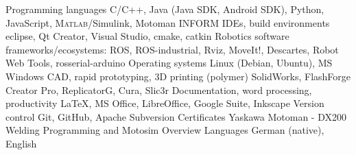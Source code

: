 
\begin{cvskills}
  \cvskill
    {Programming languages}
    {C/C++, Java (Java SDK, Android SDK), Python, JavaScript, \textsc{Matlab}/Simulink, \newline Motoman INFORM}
  \cvskill
    {IDEs, build environments}
    {eclipse, Qt Creator, Visual Studio, cmake, catkin}
  \cvskill
    {Robotics software frameworks/ecosystems:}
    {ROS, ROS-industrial, Rviz, MoveIt!, Descartes, Robot Web Tools, \newline rosserial-arduino}
  \cvskill
    {Operating systems}
    {Linux (Debian, Ubuntu), MS Windows}
  \cvskill
    {CAD, rapid prototyping, 3D printing (polymer)}
    {SolidWorks, FlashForge Creator Pro, ReplicatorG, Cura, Slic3r}
  \cvskill
    {Documentation, word processing, productivity}
    {\LaTeX, MS Office, LibreOffice, Google Suite, Inkscape}
  \cvskill
    {Version control}
    {Git, GitHub, Apache Subversion}
  \cvskill
    {Certificates}
    {Yaskawa Motoman - DX200 Welding Programming and Motosim Overview}
  \cvskill
    {Languages}
    {German (native), English}

\end{cvskills}
